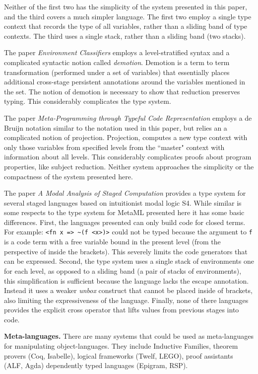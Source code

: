 \documentclass{sigplanconf}
\begin{document}
Neither of the first two has the simplicity of the 
system presented in this paper, and the third
covers a much simpler language.
The first two employ a single type context
that records the type of all variables, rather than a sliding band
of type contexts. The third uses a single stack, rather than
a sliding band (two stacks).

The paper {\it Environment Classifiers} employs a level-stratified syntax and
a complicated syntactic notion called {\it demotion}. Demotion is a term to
term transformation (performed under a set of variables) that essentially
places additional cross-stage persistent annotations around the variables
mentioned in the set. The notion of demotion is necessary to show that
reduction preserves typing. This considerably complicates the type
system.

The paper {\it Meta-Programming through Typeful Code Representation}
employs a de Bruijn notation similar to the notation used in
this paper, but relies an a complicated notion of projection. 
Projection, computes a new type context with only those
variables from specified levels from the ``master" context with
information about all levels. This considerably complicates
proofs about program properties, like subject reduction. Neither system
approaches the simplicity or the compactness of the system presented here.

The paper {\it A Modal Analysis of Staged Computation} 
\cite{Davies-Pfenning-JACM} provides a type system for several staged languages
based on intuitionist modal logic S4. While similar is some
respects to the type system for MetaML presented here it has some
basic differences. First, the languages presented can only build code
for closed terms. For example: \verb+<fn x => ~(f <x>)>+ could not be
typed because the argument to {\tt f} is a code term with a free
variable bound in the present level (from the perspective of inside
the brackets). This severely limits the code generators that can be
expressed. Second, the type system uses a single stack of
environments one for each level, as opposed to a sliding band (a pair
of stacks of environments), this simplification is sufficient because
the language lacks the escape annotation. Instead it uses a weaker
{\em unbox} construct that cannot be placed inside of brackets, also
limiting the expressiveness of the language. Finally, none of there
languages provides the explicit cross operator that lifts values from
previous stages into code.

{\bf Meta-languages.} There are many systems that could be used as 
meta-languages for manipulating object-languages. They include Inductive
Families\cite{Coquand:1994:IDT,Dybjer:1999:FAI}, theorem provers
(Coq\cite{COQ74}, Isabelle\cite{Paulson90lacs}), logical frameworks
(Twelf\cite{CADE99*202}, LEGO\cite{LuoPollack92}), proof assistants
(ALF\cite{oai:CiteSeerPSU:38734}, Agda\cite{Agda}) dependently typed languages
(Epigram\cite{epigram}, RSP\cite{Rogue}).
\end{document}
